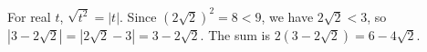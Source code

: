 For real $t$, $\sqrt{t^2}=|t|$. Since $(2\sqrt2)^2=8<9$, we have $2\sqrt2<3$, so $\left|3-2\sqrt2\right|=\left|2\sqrt2-3\right|=3-2\sqrt2$. The sum is $2\left(3-2\sqrt2\right)=\boxed{6-4\sqrt2}$.
